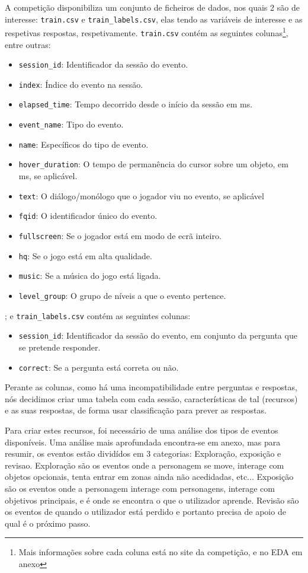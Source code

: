 \documentclass[justified, 11pt]{scrartcl}
\begin{document}
  A competição disponibiliza um conjunto de ficheiros de dados, nos quais 2 são de interesse: \texttt{train.csv} e \texttt{train\_labels.csv}, elas tendo as variáveis de interesse e as respetivas respostas, respetivamente. \texttt{train.csv} contém as seguintes colunas\footnote{Mais informações sobre cada coluna está no site da competição, e no EDA em anexo}, entre outras:
  \begin{itemize}
    \item \texttt{session\_id}: Identificador da sessão do evento.
    \item \texttt{index}: Índice do evento na sessão.
    \item \texttt{elapsed\_time}: Tempo decorrido desde o início da sessão em \si{\milli\second}.
    \item \texttt{event\_name}: Tipo do evento.
    \item \texttt{name}: Específicos do tipo de evento.
    \item \texttt{hover\_duration}: O tempo de permanência do cursor sobre um objeto, em \si{\milli\second}, se aplicável.
    \item \texttt{text}: O diálogo/monólogo que o jogador viu no evento, se aplicável
    \item \texttt{fqid}: O identificador único do evento.
    \item \texttt{fullscreen}: Se o jogador está em modo de ecrã inteiro.
    \item \texttt{hq}: Se o jogo está em alta qualidade.
    \item \texttt{music}: Se a música do jogo está ligada.
    \item \texttt{level\_group}: O grupo de níveis a que o evento pertence.
  \end{itemize}
  ; e \texttt{train\_labels.csv} contém as seguintes colunas:
  \begin{itemize}
    \item \texttt{session\_id}: Identificador da sessão do evento, em conjunto da pergunta que se pretende responder.
    \item \texttt{correct}: Se a pergunta está correta ou não.
  \end{itemize}

  Perante as colunas, como há uma incompatibilidade entre perguntas e respostas, nós decidimos criar uma tabela com cada sessão, características de tal (recursos) e as suas respostas, de forma usar classificação para prever as respostas.

  Para criar estes recursos, foi necessário de uma análise dos tipos de eventos disponíveis. Uma análise mais aprofundada encontra-se em anexo, mas para resumir, os eventos estão dividídos em 3 categorias: Exploração, exposição e revisao. Exploração são os eventos onde a personagem se move, interage com objetos opcionais, tenta entrar em zonas ainda não acedidadas, etc... Exposição são os eventos onde a personagem interage com personagens, interage com objetivos principais, e é onde se encontra o que o utilizador aprende. Revisão são os eventos de quando o utilizador está perdido e portanto precisa de apoio de qual é o próximo passo.
\end{document}
